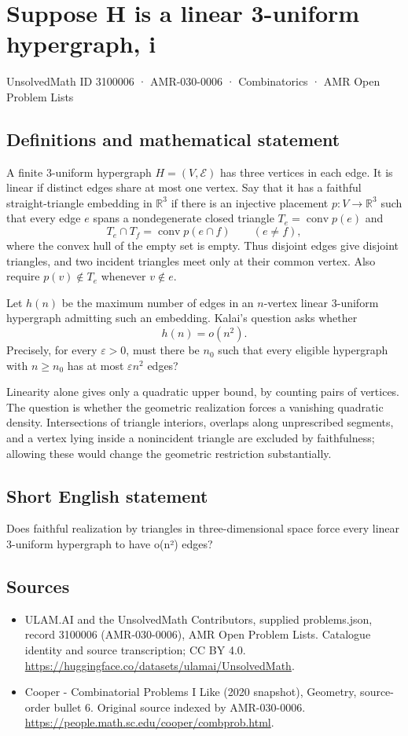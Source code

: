 \documentclass[11pt,a4paper]{article}
\begin{document}
\section*{Suppose H is a linear 3-uniform hypergraph, i}\label{3100006}
{\small UnsolvedMath ID 3100006 · AMR-030-0006 · Combinatorics · AMR Open Problem Lists}
\subsection{Definitions and mathematical statement}
A finite $3$-uniform hypergraph $H=(V,\mathcal E)$ has three vertices
in each edge. It is linear if distinct edges share at most one
vertex. Say that it has a faithful straight-triangle embedding in
$\mathbb R^3$ if there is an injective placement $p:V\to\mathbb R^3$
such that every edge $e$ spans a nondegenerate closed triangle
$T_e=\operatorname{conv}p(e)$ and
\[
 T_e\cap T_f=\operatorname{conv}p(e\cap f)
                  \qquad(e\ne f),
\]
where the convex hull of the empty set is empty. Thus disjoint edges
give disjoint triangles, and two incident triangles meet only at
their common vertex. Also require $p(v)\notin T_e$ whenever $v\notin e$.

Let $h(n)$ be the maximum number of edges in an $n$-vertex linear
$3$-uniform hypergraph admitting such an embedding. Kalai's question
asks whether
\[
                           h(n)=o(n^2).
\]
Precisely, for every $\varepsilon>0$, must there be $n_0$ such that
every eligible hypergraph with $n\ge n_0$ has at most
$\varepsilon n^2$ edges?

Linearity alone gives only a quadratic upper bound, by counting
pairs of vertices. The question is whether the geometric realization
forces a vanishing quadratic density. Intersections of triangle
interiors, overlaps along unprescribed segments, and a vertex lying
inside a nonincident triangle are excluded by faithfulness; allowing
these would change the geometric restriction substantially.
\subsection{Short English statement}
Does faithful realization by triangles in three-dimensional space force every linear 3-uniform hypergraph to have o(n²) edges?
\subsection{Sources}
\begin{itemize}
\item[S1] ULAM.AI and the UnsolvedMath Contributors, supplied problems.json, record 3100006 (AMR-030-0006), AMR Open Problem Lists. Catalogue identity and source transcription; CC BY 4.0.
\url{https://huggingface.co/datasets/ulamai/UnsolvedMath}.
\item[S2] Cooper - Combinatorial Problems I Like (2020 snapshot), Geometry, source-order bullet 6. Original source indexed by AMR-030-0006.
\url{https://people.math.sc.edu/cooper/combprob.html}.
\end{itemize}
\end{document}
